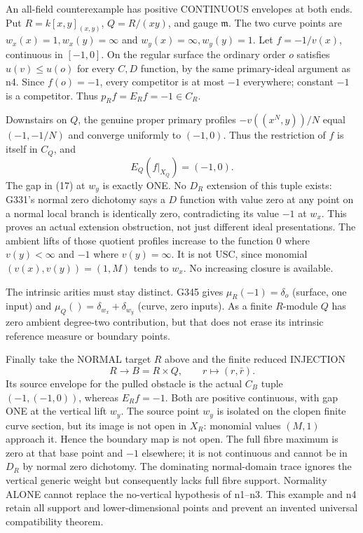 \documentclass[11pt]{article}
\begin{document}
An all-field counterexample has positive CONTINUOUS envelopes at both ends. Put $R=k[x,y]_{(x,y)}$, $Q=R/(xy)$, and gauge $\mathfrak m$. The two curve points are $w_x(x)=1,w_x(y)=\infty$ and $w_y(x)=\infty,w_y(y)=1$. Let $f=-1/v(x)$, continuous in $[-1,0]$. On the regular surface the ordinary order $o$ satisfies $u(v)\le u(o)$ for every $C,D$ function, by the same primary-ideal argument as n4. Since $f(o)=-1$, every competitor is at most $-1$ everywhere; constant $-1$ is a competitor. Thus $p_Rf=E_Rf=-1\in C_R$.

Downstairs on $Q$, the genuine proper primary profiles $-v((x^N,y))/N$ equal $(-1,-1/N)$ and converge uniformly to $(-1,0)$. Thus the restriction of $f$ is itself in $C_Q$, and
\[
E_Q(f|_{X_Q})=(-1,0).
\]
The gap in (17) at $w_y$ is exactly ONE. No $D_R$ extension of this tuple exists: G331's normal zero dichotomy says a $D$ function with value zero at any point on a normal local branch is identically zero, contradicting its value $-1$ at $w_x$. This proves an actual extension obstruction, not just different ideal presentations. The ambient lifts of those quotient profiles increase to the function $0$ where $v(y)<\infty$ and $-1$ where $v(y)=\infty$. It is not USC, since monomial $(v(x),v(y))=(1,M)$ tends to $w_x$. No increasing closure is available.

The intrinsic arities must stay distinct. G345 gives $\mu_R(-1)=\delta_o$ (surface, one input) and $\mu_Q()=\delta_{w_x}+\delta_{w_y}$ (curve, zero inputs). As a finite $R$-module $Q$ has zero ambient degree-two contribution, but that does not erase its intrinsic reference measure or boundary points.

Finally take the NORMAL target $R$ above and the finite reduced INJECTION
\[
R\longrightarrow B=R\times Q,\qquad r\longmapsto(r,\bar r).
\]
Its source envelope for the pulled obstacle is the actual $C_B$ tuple $(-1,(-1,0))$, whereas $E_Rf=-1$. Both are positive continuous, with gap ONE at the vertical lift $w_y$. The source point $w_y$ is isolated on the clopen finite curve section, but its image is not open in $X_R$: monomial values $(M,1)$ approach it. Hence the boundary map is not open. The full fibre maximum is zero at that base point and $-1$ elsewhere; it is not continuous and cannot be in $D_R$ by normal zero dichotomy. The dominating normal-domain trace ignores the vertical generic weight but consequently lacks full fibre support. Normality ALONE cannot replace the no-vertical hypothesis of n1--n3. This example and n4 retain all support and lower-dimensional points and prevent an invented universal compatibility theorem.
\end{document}
